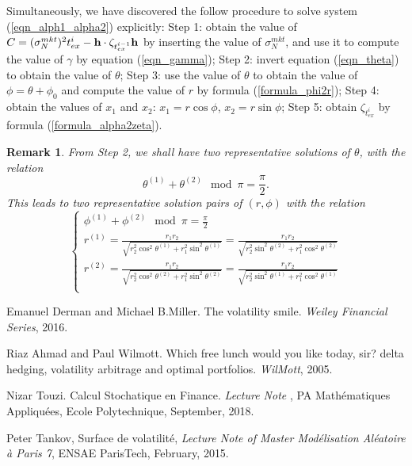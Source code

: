 \documentclass[10pt]{article}
\theoremstyle{plain}
\newtheorem{remark}{Remark}
\numberwithin{equation}{section}
\numberwithin{table}{section}
\begin{document}
\medskip

Simultaneously, we have discovered the follow procedure to solve
system (\ref{eqn_alph1_alpha2}) explicitly:
\newline Step 1: obtain the value of $C = (\sigma_N^{mkt})^2t^i_{ex} -
{\bf h} \cdot \zeta_{t^{i-1}_{ex}} {\bf h}$ by inserting the value of
$\sigma_N^{mkt}$, and use it to compute the value of $\gamma$ by
equation (\ref{eqn_gamma});
\newline Step 2: invert equation (\ref{eqn_theta}) to obtain the value
of $\theta$;
\newline Step 3: use the value of $\theta$ to obtain the value of
$\phi=\theta+\phi_0$ and compute the value of $r$ by formula
(\ref{formula_phi2r});
\newline Step 4: obtain the values of $x_1$ and $x_2$: $x_1 =
r\cos\phi$, $x_2 = r\sin\phi$;
\newline Step 5: obtain $\zeta_{t_{ex}^i}$ by formula
(\ref{formula_alpha2zeta}).

\begin{remark}
From Step 2, we shall have two representative solutions of $\theta$,
with the relation
\[
\theta^{(1)}+\theta^{(2)} \mod \pi = \frac{\pi}{2}.
\]
This leads to two representative solution pairs of $(r,\phi)$ with the relation
\[
\begin{cases}
\phi^{(1)}+\phi^{(2)} \mod \pi = \frac{\pi}{2} \\
r^{(1)} = \frac{r_1r_2}{\sqrt{r_2^2\cos^2\theta^{(1)} + r_1^2
\sin^2\theta^{(1)}}} = \frac{r_1r_2}{\sqrt{r_2^2\sin^2\theta^{(2)} +
r_1^2 \cos^2\theta^{(2)}}}\\
r^{(2)} = \frac{r_1r_2}{\sqrt{r_2^2\cos^2\theta^{(2)} + r_1^2
\sin^2\theta^{(2)}}} =
\frac{r_1r_2}{\sqrt{r_2^2\sin^2\theta^{(1)} + r_1^2 \cos^2\theta^{(1)}}}\\
\end{cases}
\]
\end{remark}


\begin{appendix}


\end{appendix}

\begin{thebibliography}{99}

 Emanuel Derman and Michael B.Miller. The volatility smile. {\it
Weiley Financial Series}, 2016.

 Riaz Ahmad and Paul Wilmott. Which free lunch would you like today, sir? delta hedging, volatility arbitrage and optimal portfolios. {\it
WilMott}, 2005.

 Nizar Touzi. Calcul Stochatique en Finance. {\it
Lecture Note} {\bf}, PA Math\'ematiques Appliqu\'ees, Ecole Polytechnique, September, 2018.

 Peter Tankov, Surface de volatilit\'e, {\it
Lecture Note of Master Mod\'elisation Al\'eatoire \`a Paris 7}, ENSAE ParisTech, February, 2015.

\end{thebibliography}
\end{document}
